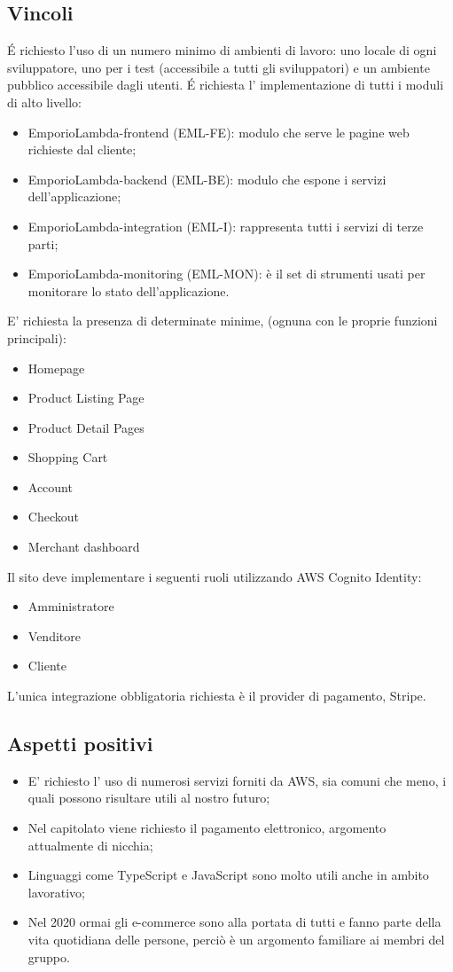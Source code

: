 \subsection{Vincoli}
\'E richiesto l'uso di un numero minimo di ambienti di lavoro: uno locale di ogni sviluppatore, uno per i test (accessibile a tutti gli sviluppatori) e un ambiente pubblico accessibile dagli utenti.
\'E richiesta l' implementazione di tutti i moduli di alto livello:
\begin{itemize}
\item	EmporioLambda-frontend (EML-FE): modulo che serve le pagine web richieste dal cliente;
\item	EmporioLambda-backend (EML-BE): modulo che espone i servizi dell'applicazione;
\item	EmporioLambda-integration (EML-I): rappresenta tutti i servizi di terze parti;
\item	 EmporioLambda-monitoring (EML-MON): è il set di strumenti usati per monitorare lo stato dell'applicazione.
\end{itemize}
E' richiesta la presenza di determinate minime, (ognuna con le proprie funzioni principali):
\begin{itemize}
\item	Homepage
\item	Product Listing Page
\item	Product Detail Pages
\item	Shopping Cart
\item	Account
\item	Checkout
\item	Merchant dashboard
\end{itemize}
Il sito deve implementare i seguenti ruoli utilizzando AWS Cognito Identity:
\begin{itemize}
\item	Amministratore
\item	Venditore
\item	Cliente
\end{itemize}
L'unica integrazione obbligatoria richiesta è il provider di pagamento, Stripe.
\subsection{Aspetti positivi}
\begin{itemize}
\item	E' richiesto l' uso di numerosi servizi forniti da AWS, sia comuni che meno, i quali possono risultare utili al nostro futuro;
\item	Nel capitolato viene richiesto il pagamento elettronico, argomento attualmente di nicchia;
\item	Linguaggi come TypeScript e JavaScript sono molto utili anche in ambito lavorativo;
\item	Nel 2020 ormai gli e-commerce sono alla portata di tutti e fanno parte della vita quotidiana delle persone, perciò è un argomento familiare ai membri del gruppo.
\end{itemize}

